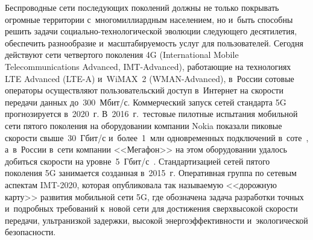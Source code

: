 \begin{multicols}{2}
  Беспроводные сети последующих поколений должны не только покрывать 
огромные территории с~многомиллиардным населением, но и~быть способны 
решить задачи со\-ци\-аль\-но-тех\-но\-ло\-ги\-че\-ской эволюции 
следующего десятилетия, обеспечить разнообразие и~масштабируемость 
услуг для пользователей. Сегодня действуют сети четвертого поколения 4G 
(International Mobile Telecommunications Advanced, IMT-Advanced), 
работающие на технологиях LTE Advanced (LTE-A) и~WiMAX~2  
(WMAN-Advanced), в~России сотовые операторы осуществляют 
пользовательский доступ в~Интернет на скорости передачи данных 
до~300~Мбит/с. Коммерческий запуск сетей стандарта 5G прогнозируется 
в~2020~г. В~2016~г.\ тестовые пилотные испытания мобильной сети пятого 
поколения на оборудовании компании Nokia показали пиковые скорости 
свыше~30~Гбит/с и~более~1~млн одновременных подключений 
в~соте~\cite{4-gai}, а~в~России в~сети компании <<Мегафон>> на этом 
оборудовании удалось добиться скорости на уровне~5~Гбит/с~\cite{5-gai}. 
Стандартизацией сетей пятого поколения 5G занимается созданная в~2015~г. 
Оперативная группа по сетевым аспектам IMT-2020, которая опубликовала 
так называемую <<дорожную карту>> развития мобильной сети 5G, где 
обозначена задача разработки точных и~подробных требований к~новой сети 
для достижения сверхвысокой скорости передачи, ультранизкой задержки, 
высокой энергоэффективности и~экологической безопасности. 
  

\end{multicols}
